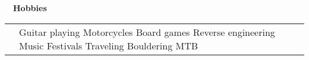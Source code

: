 \documentclass[a4paper, 11pt]{article}
\newcommand{\sectitle}[2]{\large{#1} \ \ \Large{\textbf{#2}}}
\begin{document}
	\newcommand{\hobbies}[2]{
		\textsc{#1} & \multicolumn{2}{p{0.9\textwidth}}{\footnotesize{#2}} \\
	}

	\let\cleardoublepage\clearpage
	
	\begin{section}{\sectitle{\faMotorcycle}{Hobbies}}
		\begin{tabularx}{\linewidth}{@{}p{1.4cm} | X r}
			\hobbies{}{
			\normalsize 
			Guitar playing \hspace{6ex}
			Motorcycles \hspace{6ex}
			Board games \hspace{6ex}
			Reverse engineering \hspace{6ex}
			Music \hspace{6ex}
			Festivals \hspace{6ex}
			Traveling \hspace{6ex}
			Bouldering \hspace{6ex}
			MTB\hspace{6ex}
			}
		\end{tabularx}
	\end{section}
	\vspace{-3.5mm}
\end{document}
